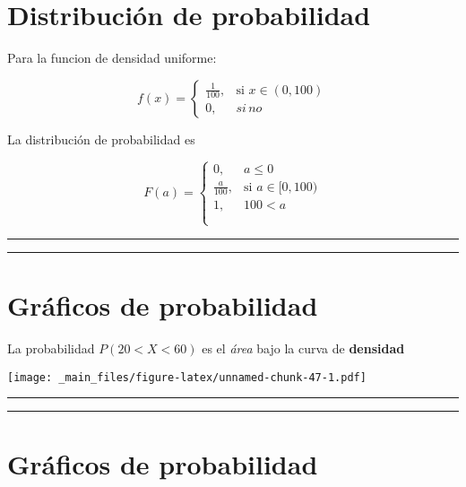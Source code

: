 \documentclass[
]{book}
\begin{document}
\hypertarget{distribuciuxf3n-de-probabilidad-4}{%
\section{Distribución de probabilidad}\label{distribuciuxf3n-de-probabilidad-4}}

Para la funcion de densidad uniforme:

\[
    f(x)= 
\begin{cases}
    \frac{1}{100},& \text{si } x\in (0,100)\\
    0,& si \,no 
\end{cases}
\]

La distribución de probabilidad es

\[
    F(a)= 
\begin{cases}
    0,& a \leq 0 \\
    \frac{a}{100},& \text{si } a\in [0,100)\\
    1, & 100 < a \\
    \\
\end{cases}
\]

\begin{center}\rule{0.5\linewidth}{0.5pt}\end{center}

\begin{center}\rule{0.5\linewidth}{0.5pt}\end{center}

\hypertarget{gruxe1ficos-de-probabilidad}{%
\section{Gráficos de probabilidad}\label{gruxe1ficos-de-probabilidad}}

La probabilidad \(P(20<X<60)\) es el \emph{área} bajo la curva de \textbf{densidad}

\texttt{[image: \_main\_files/figure-latex/unnamed-chunk-47-1.pdf]}

\begin{center}\rule{0.5\linewidth}{0.5pt}\end{center}

\begin{center}\rule{0.5\linewidth}{0.5pt}\end{center}

\hypertarget{gruxe1ficos-de-probabilidad-1}{%
\section{Gráficos de probabilidad}\label{gruxe1ficos-de-probabilidad-1}}
\end{document}

